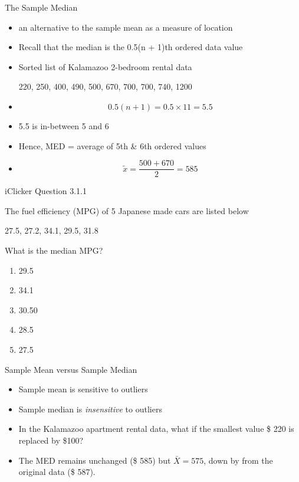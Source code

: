 \documentclass[14pt]{beamer}\usepackage[]{graphicx}\usepackage[]{color}
\begin{document}
\begin{frame}[fragile]{The Sample Median}



{\footnotesize{
\begin{itemize}
\item<1-> an alternative to the sample mean as a measure of location

\item<1-> Recall that the median is the 0.5(n + 1)th ordered data value

\item<1-> Sorted list of Kalamazoo 2-bedroom rental data

\vspace{3mm}

220, 250, 400, 490, 500, 670, 700, 700, 740, 1200
\item<2->
\begin{equation*}
0.5(n + 1) = 0.5 \times 11 = 5.5
\end{equation*}

\item<3-> 5.5 is in-between 5 and 6
\item<4-> Hence, MED = average of 5th \& 6th ordered values
\item<5->
\begin{equation*}
\tilde{x} = \frac{ 500 + 670 }{2} = 585
\end{equation*}
\end{itemize}
}}
\end{frame}

\begin{frame}[fragile]{iClicker Question 3.1.1}


The fuel efficiency (MPG) of 5 Japanese made cars are listed below

\begin{center}
27.5, 27.2, 34.1, 29.5, 31.8
\end{center}

What is the median MPG?

\begin{enumerate}
\item 29.5
\item 34.1
\item 30.50
\item 28.5
\item 27.5
\end{enumerate}
\end{frame}

\begin{frame}[fragile]{Sample Mean versus Sample Median}

\begin{itemize}
\item<1-> Sample mean is sensitive to outliers
\item<2-> Sample median is \textit{insensitive} to outliers
\item<3-> In the Kalamazoo apartment rental data, what if the smallest value \$ 220 is replaced by \$100?
\item<4-> The MED remains unchanged (\$ 585) but $\bar{X} = 575$, down by from the original data (\$ 587).
\end{itemize}
\end{frame}
\end{document}
